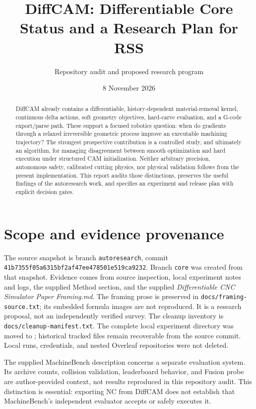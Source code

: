 \documentclass[11pt]{article}
\title{DiffCAM: Differentiable Core Status and a Research Plan for RSS}
\author{Repository audit and proposed research program}
\date{8 November 2026}
\begin{document}
\maketitle
\begin{abstract}
DiffCAM already contains a differentiable, history-dependent material-removal
kernel, continuous delta actions, soft geometry objectives, hard-carve evaluation,
and a G-code export/parse path. These support a focused robotics question:
when do gradients through a relaxed irreversible geometric process improve an
executable machining trajectory? The strongest prospective contribution is a
controlled study, and ultimately an algorithm, for managing disagreement between
smooth optimization and hard execution under structured CAM initialization.
Neither arbitrary precision, autonomous safety, calibrated cutting physics, nor
physical validation follows from the present implementation. This report audits
those distinctions, preserves the useful findings of the autoresearch work, and
specifies an experiment and release plan with explicit decision gates.
\end{abstract}

\section{Scope and evidence provenance}
The source snapshot is branch \texttt{autoresearch}, commit
\texttt{41b7355f05a6315bf2af47ee478501e519ca9232}. Branch \texttt{core}
was created from that snapshot. Evidence comes from source inspection, local
experiment notes and logs, the supplied Method section, and the supplied
\emph{Differentiable CNC Simulator Paper Framing.md}. The framing prose is
preserved in \texttt{docs/framing-source.txt}; its embedded formula images are
not reproduced. It is a research proposal, not an independently verified survey.
The cleanup inventory is \texttt{docs/cleanup-manifest.txt}. The complete local
experiment directory was moved to
; historical tracked files
remain recoverable from the source commit. Local runs, credentials, and nested
Overleaf repositories were not deleted.

The supplied MachineBench description concerns a separate evaluation system.
Its archive counts, collision validation, leaderboard behavior, and Fusion probe
are author-provided context, not results reproduced in this repository audit.
This distinction is essential: exporting NC from DiffCAM does not establish that
MachineBench's independent evaluator accepts or safely executes it.
\end{document}

